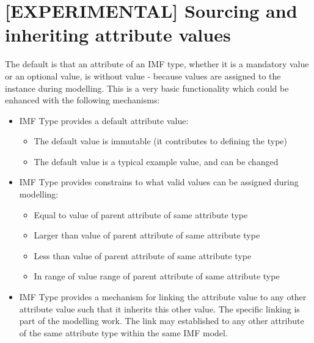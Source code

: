 \documentclass[../main.tex]{subfiles}
\begin{document}
\section{[EXPERIMENTAL] Sourcing and inheriting attribute values}
The default is that an attribute of an IMF type, whether it is a mandatory value or an optional value, is without value - because values are assigned to the instance during modelling. This is a very basic functionality which could be enhanced with the following mechanisms:
\begin{itemize}
    \item IMF Type provides a default attribute value:
    \begin{itemize}
        \item The default value is immutable (it contributes to defining the type)
        \item The default value is a typical example value, and can be changed
    \end{itemize}
    \item IMF Type provides constrains to what valid values can be assigned during modelling:
    \begin{itemize}
        \item Equal to value of parent attribute of same attribute type
        \item Larger than value of parent attribute of same attribute type
        \item Less than value of parent attribute of same attribute type
        \item In range of value range of parent attribute of same attribute type
    \end{itemize}

  \item IMF Type provides a mechanism for linking the attribute value to any other attribute value such that it inherits this other value. The specific linking is part of the modelling work. The link may established to any other attribute of the same attribute type within the same IMF model.

  \end{itemize}
\end{document}
